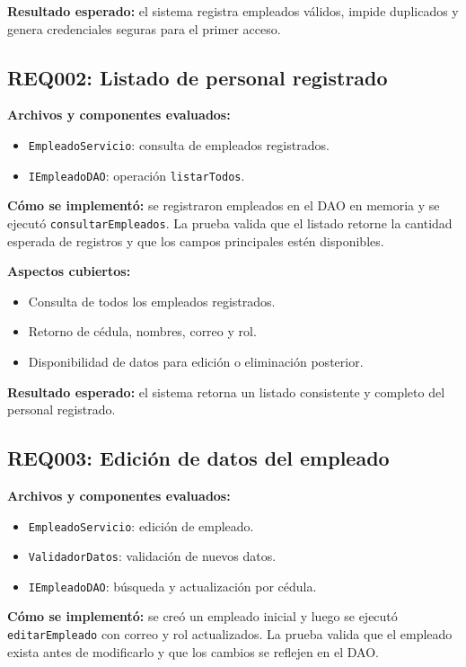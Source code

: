 \documentclass[12pt,a4paper]{article}
\begin{document}
\textbf{Resultado esperado:} el sistema registra empleados válidos, impide duplicados y genera credenciales seguras para el primer acceso.

\subsection{REQ002: Listado de personal registrado}

\textbf{Archivos y componentes evaluados:}
\begin{itemize}[leftmargin=*]
    \item \texttt{EmpleadoServicio}: consulta de empleados registrados.
    \item \texttt{IEmpleadoDAO}: operación \texttt{listarTodos}.
\end{itemize}

\textbf{Cómo se implementó:} se registraron empleados en el DAO en memoria y se ejecutó \texttt{consultarEmpleados}. La prueba valida que el listado retorne la cantidad esperada de registros y que los campos principales estén disponibles.

\textbf{Aspectos cubiertos:}
\begin{itemize}[leftmargin=*]
    \item Consulta de todos los empleados registrados.
    \item Retorno de cédula, nombres, correo y rol.
    \item Disponibilidad de datos para edición o eliminación posterior.
\end{itemize}

\textbf{Resultado esperado:} el sistema retorna un listado consistente y completo del personal registrado.

\subsection{REQ003: Edición de datos del empleado}

\textbf{Archivos y componentes evaluados:}
\begin{itemize}[leftmargin=*]
    \item \texttt{EmpleadoServicio}: edición de empleado.
    \item \texttt{ValidadorDatos}: validación de nuevos datos.
    \item \texttt{IEmpleadoDAO}: búsqueda y actualización por cédula.
\end{itemize}

\textbf{Cómo se implementó:} se creó un empleado inicial y luego se ejecutó \texttt{editarEmpleado} con correo y rol actualizados. La prueba valida que el empleado exista antes de modificarlo y que los cambios se reflejen en el DAO.
\end{document}
